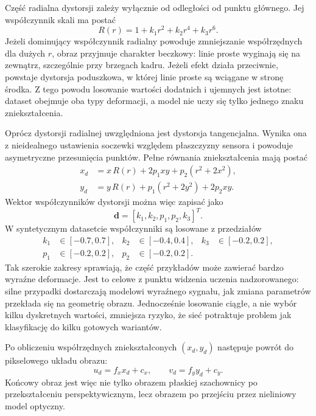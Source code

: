 \documentclass[12pt,a4paper]{report}
\begin{document}
Część radialna dystorsji zależy wyłącznie od odległości od punktu głównego. Jej współczynnik
skali ma postać
\begin{equation}
    R(r) = 1 + k_1 r^2 + k_2 r^4 + k_3 r^6.
\end{equation}
Jeżeli dominujący współczynnik radialny powoduje zmniejszanie współrzędnych dla dużych $r$,
obraz przyjmuje charakter beczkowy: linie proste wyginają się na zewnątrz, szczególnie przy
brzegach kadru. Jeżeli efekt działa przeciwnie, powstaje dystorsja poduszkowa, w której linie
proste są wciągane w stronę środka. Z tego powodu losowanie wartości dodatnich i ujemnych jest
istotne: dataset obejmuje oba typy deformacji, a model nie uczy się tylko jednego znaku
zniekształcenia.

Oprócz dystorsji radialnej uwzględniona jest dystorsja tangencjalna. Wynika ona z nieidealnego
ustawienia soczewki względem płaszczyzny sensora i powoduje asymetryczne przesunięcia punktów.
Pełne równania zniekształcenia mają postać
\begin{align}
    x_d &= x\,R(r) + 2p_1xy + p_2(r^2 + 2x^2), \\
    y_d &= y\,R(r) + p_1(r^2 + 2y^2) + 2p_2xy.
\end{align}
Wektor współczynników dystorsji można więc zapisać jako
\begin{equation}
    \mathbf{d} = [k_1,k_2,p_1,p_2,k_3]^T.
\end{equation}
W syntetycznym datasetcie współczynniki są losowane z przedziałów
\begin{align}
    k_1 &\in [-0.7,0.7], &
    k_2 &\in [-0.4,0.4], &
    k_3 &\in [-0.2,0.2], \\
    p_1 &\in [-0.2,0.2], &
    p_2 &\in [-0.2,0.2].
\end{align}
Tak szerokie zakresy sprawiają, że część przykładów może zawierać bardzo wyraźne deformacje.
Jest to celowe z punktu widzenia uczenia nadzorowanego: silne przypadki dostarczają modelowi
wyraźnego sygnału, jak zmiana parametrów przekłada się na geometrię obrazu. Jednocześnie losowanie
ciągłe, a nie wybór kilku dyskretnych wartości, zmniejsza ryzyko, że sieć potraktuje problem
jak klasyfikację do kilku gotowych wariantów.

Po obliczeniu współrzędnych zniekształconych $(x_d,y_d)$ następuje powrót do pikselowego układu
obrazu:
\begin{equation}
    u_d = f_x x_d + c_x,
    \qquad
    v_d = f_y y_d + c_y.
\end{equation}
Końcowy obraz jest więc nie tylko obrazem płaskiej szachownicy po przekształceniu
perspektywicznym, lecz obrazem po przejściu przez nieliniowy model optyczny.
\end{document}
